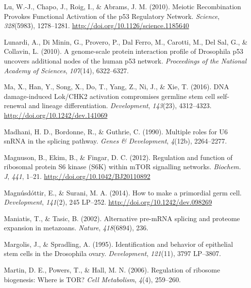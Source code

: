 \documentclass[12pt,oneside]{reedthesis}
\newlength{\cslhangindent}
\newenvironment{cslreferences}%
  {\setlength{\parindent}{0pt}%
  \everypar{\setlength{\hangindent}{\cslhangindent}}\ignorespaces}%
  {\par}
\begin{document}
\begin{cslreferences}
\leavevmode\hypertarget{ref-luMeioticRecombinationProvokes2010}{}%
Lu, W.-J., Chapo, J., Roig, I., \& Abrams, J. M. (2010). Meiotic Recombination Provokes Functional Activation of the p53 Regulatory Network. \emph{Science}, \emph{328}(5983), 1278--1281. \url{http://doi.org/10.1126/science.1185640}

\leavevmode\hypertarget{ref-Lunardi2010a}{}%
Lunardi, A., Di Minin, G., Provero, P., Dal Ferro, M., Carotti, M., Del Sal, G., \& Collavin, L. (2010). A genome-scale protein interaction profile of Drosophila p53 uncovers additional nodes of the human p53 network. \emph{Proceedings of the National Academy of Sciences}, \emph{107}(14), 6322--6327.

\leavevmode\hypertarget{ref-maDNADamageinducedLok2016}{}%
Ma, X., Han, Y., Song, X., Do, T., Yang, Z., Ni, J., \& Xie, T. (2016). DNA damage-induced Lok/CHK2 activation compromises germline stem cell self-renewal and lineage differentiation. \emph{Development}, \emph{143}(23), 4312--4323. \url{http://doi.org/10.1242/dev.141069}

\leavevmode\hypertarget{ref-Madhani1990}{}%
Madhani, H. D., Bordonne, R., \& Guthrie, C. (1990). Multiple roles for U6 snRNA in the splicing pathway. \emph{Genes \& Development}, \emph{4}(12b), 2264--2277.

\leavevmode\hypertarget{ref-Magnuson2012c}{}%
Magnuson, B., Ekim, B., \& Fingar, D. C. (2012). Regulation and function of ribosomal protein S6 kinase (S6K) within mTOR signalling networks. \emph{Biochem. J}, \emph{441}, 1--21. \url{http://doi.org/10.1042/BJ20110892}

\leavevmode\hypertarget{ref-Magnusdottir2014d}{}%
Magnúsdóttir, E., \& Surani, M. A. (2014). How to make a primordial germ cell. \emph{Development}, \emph{141}(2), 245 LP--252. \url{http://doi.org/10.1242/dev.098269}

\leavevmode\hypertarget{ref-Maniatis2002}{}%
Maniatis, T., \& Tasic, B. (2002). Alternative pre-mRNA splicing and proteome expansion in metazoans. \emph{Nature}, \emph{418}(6894), 236.

\leavevmode\hypertarget{ref-Margolis1995a}{}%
Margolis, J., \& Spradling, A. (1995). Identification and behavior of epithelial stem cells in the Drosophila ovary. \emph{Development}, \emph{121}(11), 3797 LP--3807.

\leavevmode\hypertarget{ref-Martin2006a}{}%
Martin, D. E., Powers, T., \& Hall, M. N. (2006). Regulation of ribosome biogenesis: Where is TOR? \emph{Cell Metabolism}, \emph{4}(4), 259--260.


\end{cslreferences}
\end{document}
